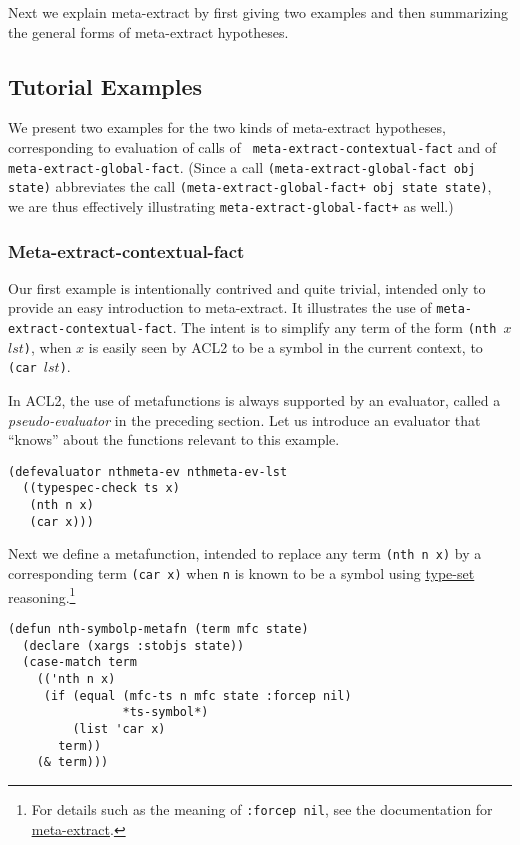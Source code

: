 Next we explain meta-extract by first giving two examples and then
summarizing the general forms of meta-extract hypotheses.

\subsection{Tutorial Examples}

We present two examples for the two kinds of meta-extract hypotheses,
corresponding to evaluation of calls of {\tt
  meta-extract-contextual-fact} and of {\tt meta-extract-global-fact}.
(Since a call {\tt (meta-extract-global-fact obj state)} abbreviates
the call {\tt (meta-extract-global-fact+ obj state state)}, we are
thus effectively illustrating {\tt meta-extract-global-fact+} as
well.)

\subsubsection{Meta-extract-contextual-fact}

Our first example is intentionally contrived and quite trivial,
intended only to provide an easy introduction to meta-extract.  It
illustrates the use of {\tt meta-extract-contextual-fact}.  The intent
is to simplify any term of the form {\tt (nth $x$ $lst$)}, when $x$ is
easily seen by ACL2 to be a symbol in the current context, to {\tt
  (car $lst$)}.

In ACL2, the use of metafunctions is always supported by an evaluator,
called a {\em pseudo-evaluator} in the preceding section.  Let us
introduce an evaluator that ``knows'' about the functions relevant to
this example.

\begin{verbatim}
(defevaluator nthmeta-ev nthmeta-ev-lst
  ((typespec-check ts x)
   (nth n x)
   (car x)))
\end{verbatim}

\noindent Next we define a metafunction, intended to replace any term
{\tt (nth n x)} by a corresponding term {\tt (car x)} when {\tt n} is
known to be a symbol using
\href{http://www.cs.utexas.edu/users/moore/acl2/manuals/current/manual/index.html?topic=ACL2\_\_\_\_TYPE-SET}{\underline{type-set}}
reasoning.\footnote{For details such as the meaning of {\tt :forcep
    nil}, see the documentation for \href{http://www.cs.utexas.edu/users/moore/acl2/manuals/current/manual/index.html?topic=ACL2\_\_\_\_META-EXTRACT}{\underline{meta-extract}}.}

\begin{verbatim}
(defun nth-symbolp-metafn (term mfc state)
  (declare (xargs :stobjs state))
  (case-match term
    (('nth n x)
     (if (equal (mfc-ts n mfc state :forcep nil)
                *ts-symbol*)
         (list 'car x)
       term))
    (& term)))
\end{verbatim}

